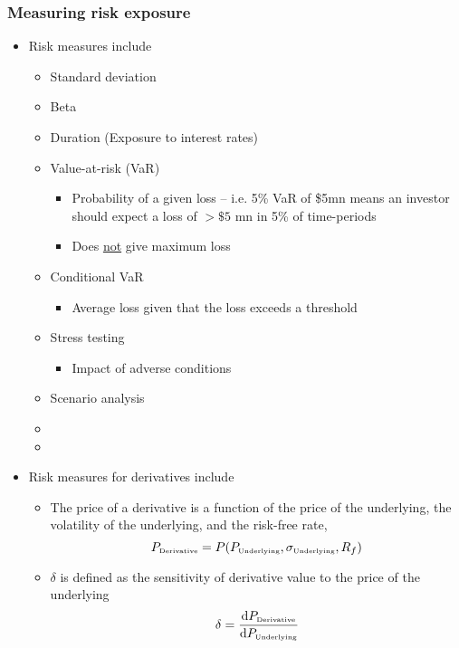 \documentclass[../notes_compiled.tex]{subfiles}
\begin{document}
\subsubsection{Measuring risk exposure}
\begin{itemize}
\item Risk measures include
\begin{multicols}{2}
\begin{itemize}
\item Standard deviation
\item Beta
\item Duration (Exposure to interest rates)
\item Value-at-risk (VaR)
\begin{itemize}
\item Probability of a given loss -- i.e. 5\% VaR of \$5mn means an investor should expect a loss of $>\$5$ mn in 5\% of time-periods
\item Does \underline{not} give maximum loss
\end{itemize}
\item Conditional VaR
\begin{itemize}
\item Average loss given that the loss exceeds a threshold
\end{itemize}
\item Stress testing
\begin{itemize}
\item Impact of adverse conditions
\end{itemize}
\item Scenario analysis
\item[]
\item[]
\end{itemize}
\end{multicols}
\item Risk measures for derivatives include
\begin{itemize}
\item The price of a derivative is a function of the price of the underlying, the volatility of the underlying, and the risk-free rate,
\begin{equation}
P_{\text{\tiny{Derivative}}} = P(P_{\text{\tiny{Underlying}}}, \sigma_{\text{\tiny{Underlying}}}, R_{f})
\end{equation}
\item $\delta$ is defined as the sensitivity of derivative value to the price of the underlying
\begin{equation}
\delta = \frac{\mathrm{d}P_{\text{\tiny{Derivative}}}}{\mathrm{d}P_{\text{\tiny{Underlying}}}}

\end{equation}
\end{itemize}
\end{itemize}
\end{document}
